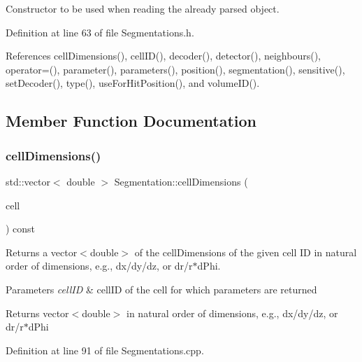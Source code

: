 Constructor to be used when reading the already parsed object. 



Definition at line 63 of file Segmentations.\+h.



References cell\+Dimensions(), cell\+I\+D(), decoder(), detector(), neighbours(), operator=(), parameter(), parameters(), position(), segmentation(), sensitive(), set\+Decoder(), type(), use\+For\+Hit\+Position(), and volume\+I\+D().



\subsection{Member Function Documentation}
\hypertarget{class_d_d4hep_1_1_geometry_1_1_segmentation_adf4cbe07d7bb13303704ecff724721dd}{}\label{class_d_d4hep_1_1_geometry_1_1_segmentation_adf4cbe07d7bb13303704ecff724721dd} 
\subsubsection{\texorpdfstring{cell\+Dimensions()}{cellDimensions()}}
{\footnotesize\ttfamily std\+::vector$<$ double $>$ Segmentation\+::cell\+Dimensions (\begin{DoxyParamCaption}\item[{const Cell\+ID \&}]{cell }\end{DoxyParamCaption}) const}



Returns a vector$<$double$>$ of the cell\+Dimensions of the given cell ID in natural order of dimensions, e.\+g., dx/dy/dz, or dr/r$\ast$d\+Phi. 


\begin{DoxyParams}{Parameters}
{\em cell\+ID} & cell\+ID of the cell for which parameters are returned \\
\hline
\end{DoxyParams}
\begin{DoxyReturn}{Returns}
vector$<$double$>$ in natural order of dimensions, e.\+g., dx/dy/dz, or dr/r$\ast$d\+Phi 
\end{DoxyReturn}


Definition at line 91 of file Segmentations.\+cpp.



